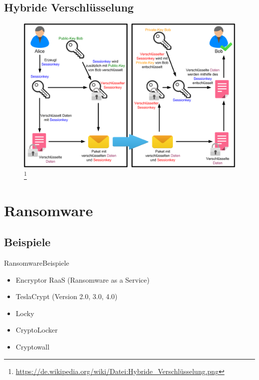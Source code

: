 \documentclass[notes,10pt]{beamer}
\begin{document}
\subsection{Hybride Verschlüsselung}
\begin{frame}[plain]
	\begin{figure}[p]
		\centering
		\includegraphics[scale=0.25]{hybrid.png}
		\let\thefootnote\relax\footnote{\url{https://de.wikipedia.org/wiki/Datei:Hybride_Verschlüsselung.png}}
	\end{figure}
\end{frame}



\section{Ransomware}
\subsection{Beispiele}
\begin{frame}{Ransomware}{Beispiele}
	\begin{itemize}
		\item Encryptor RaaS (Ransomware as a Service)
		\item TeslaCrypt (Version 2.0, 3.0, 4.0)
		\item Locky
		\item CryptoLocker
		\item Cryptowall
	\end{itemize}
\end{frame}
\end{document}
